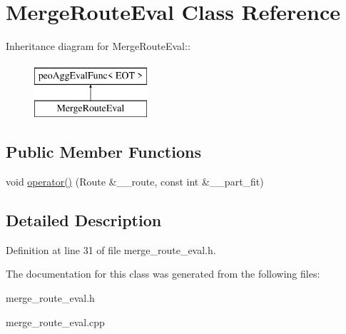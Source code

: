 \hypertarget{classMergeRouteEval}{
\section{Merge\-Route\-Eval Class Reference}
\label{classMergeRouteEval}
}
Inheritance diagram for Merge\-Route\-Eval::\begin{figure}[H]
\begin{center}
\leavevmode
\includegraphics[height=2cm]{classMergeRouteEval}
\end{center}
\end{figure}
\subsection*{Public Member Functions}
\begin{CompactItemize}
\item 
\hypertarget{classMergeRouteEval_29cb0028ac0df4b2cee3a809c8f35dea}{
void \hyperlink{classMergeRouteEval_29cb0028ac0df4b2cee3a809c8f35dea}{operator()} (Route \&\_\-\_\-route, const int \&\_\-\_\-part\_\-fit)}
\label{classMergeRouteEval_29cb0028ac0df4b2cee3a809c8f35dea}

\end{CompactItemize}


\subsection{Detailed Description}




Definition at line 31 of file merge\_\-route\_\-eval.h.

The documentation for this class was generated from the following files:\begin{CompactItemize}
\item 
merge\_\-route\_\-eval.h\item 
merge\_\-route\_\-eval.cpp\end{CompactItemize}

